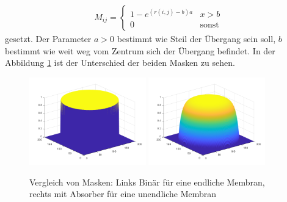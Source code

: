 \begin{align}
	M_{ij} = \begin{cases} 1-e^{(r(i,j)-b)a} & \text{$x > b$} \\
		0 & \text{sonst} \end{cases}
\end{align}
gesetzt.
Der Parameter $a > 0$ bestimmt wie Steil der Übergang sein soll, $b$ bestimmt  wie weit weg vom Zentrum sich der Übergang befindet.
In der Abbildung \ref{kreismembran:im:masks} ist der Unterschied der beiden Masken zu sehen. 
\begin{figure}
	
	\begin{center}
		
		\includegraphics[width=0.45\textwidth]{papers/kreismembran/images/mask_disk.png}
		\includegraphics[width=0.45\textwidth]{papers/kreismembran/images/mask_absorber.png}
		\caption{Vergleich von Masken: Links Binär für eine endliche Membran, rechts mit Absorber für eine unendliche Membran}
		\label{kreismembran:im:masks}
	\end{center}	
\end{figure} 
